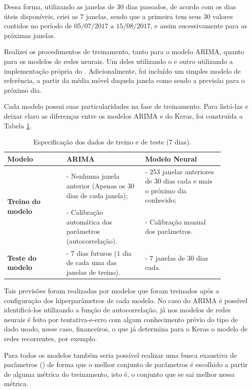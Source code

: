Dessa forma, utilizando as janelas de $30$ dias passados, de acordo com os dias úteis disponíveis, criei as $7$ janelas, sendo que a primeira tem seus $30$ valores contidos no período de $05/07/2017$ a $15/08/2017$, e assim sucessivamente para as próximas janelas.

Realizei os procedimentos de treinamento, tanto para o modelo ARIMA, quanto para os modelos de redes neurais. Um deles utilizando o  e outro utilizando a implementação própria do . Adicionalmente, foi incluído um simples modelo de referência, a partir da média móvel daquela janela como sendo a previsão para o próximo dia. 

Cada modelo possui suas particularidades na fase de treinamento. Para listá-las e deixar claro as diferenças entre os modelos ARIMA e do Keras, foi construída a Tabela \ref{tabela:params_0}.

\begin{table}[]
\begin{center}
\begin{tabular}{|p{0.24\linewidth}|p{0.32\linewidth}|p{0.32\linewidth}|}
\hline
\textbf{Modelo} & \textbf{ARIMA} & \textbf{Modelo Neural} \\
\hline
\hline
\multirow{2}{*}{\textbf{Treino do modelo}} 
& - Nenhuma janela anterior (Apenas os $30$ dias de cada janela); & - $253$ janelas anteriores de $30$ dias cada e mais o próximo dia conhecido;  \\
& - Calibração automática dos parâmetros (autocorrelação). & - Calibração manual dos parâmetros. \\
\hline
\textbf{Teste do modelo} 
& - $7$ dias futuros ($1$ dia de cada uma das janelas de treino). & - $7$ janelas de $30$ dias cada. \\
\hline
\end{tabular}
\caption{Especificação dos dados de treino e de teste ($7$ dias).}\label{tabela:params_0}
\end{center}
\end{table}

Tais previsões foram realizadas por modelos que foram treinados após a configuração dos hiperparâmetros de cada modelo. No caso do ARIMA é possível identificá-los utilizando a função de autocorrelação, já nos modelos de redes neurais é feito por tentativa-e-erro com algum conhecimento prévio do tipo de dado usado, nesse caso, financeiros, o que já determina para o Keras o modelo de redes recorrentes, por exemplo. 

Para todos os modelos também seria possível realizar uma busca exaustiva de parâmetros () de forma que o melhor conjunto de parâmetros é escolhido a partir de alguma métrica do treinamento, isto é, o conjunto que se sai melhor nessa métrica. 

